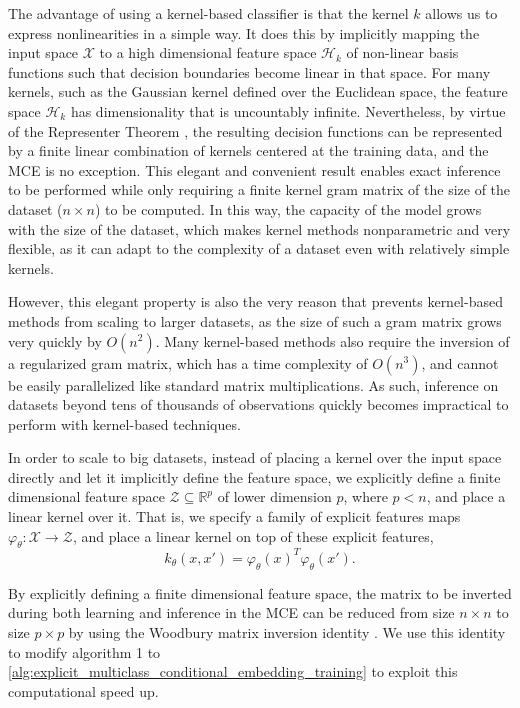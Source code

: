 \documentclass[runningheads, envcountsame, a4paper]{llncs}
\begin{document}
			The advantage of using a kernel-based classifier is that the kernel $k$ allows us to express nonlinearities in a simple way. It does this by implicitly mapping the input space $\mathcal{X}$ to a high dimensional feature space $\mathcal{H}_{k}$ of non-linear basis functions such that decision boundaries become linear in that space. For many kernels, such as the Gaussian kernel defined over the Euclidean space, the feature space $\mathcal{H}_{k}$ has dimensionality that is uncountably infinite. Nevertheless, by virtue of the Representer Theorem \citep{kimeldorf1971some}, the resulting decision functions can be represented by a finite linear combination of kernels centered at the training data, and the \gls{MCE} is no exception. This elegant and convenient result enables exact inference to be performed while only requiring a finite kernel gram matrix of the size of the dataset ($n \times n$) to be computed. In this way, the capacity of the model grows with the size of the dataset, which makes kernel methods nonparametric and very flexible, as it can adapt to the complexity of a dataset even with relatively simple kernels. 
			
			However, this elegant property is also the very reason that prevents kernel-based methods from scaling to larger datasets, as the size of such a gram matrix grows very quickly by $O(n^{2})$. Many kernel-based methods also require the inversion of a regularized gram matrix, which has a time complexity of $O(n^{3})$, and cannot be easily parallelized like standard matrix multiplications. As such, inference on datasets beyond tens of thousands of observations quickly becomes impractical to perform with kernel-based techniques.
			
			In order to scale to big datasets, instead of placing a kernel over the input space directly and let it implicitly define the feature space, we explicitly define a finite dimensional feature space $\mathcal{Z} \subseteq \mathbb{R}^{p}$ of lower dimension $p$, where $p < n$, and place a linear kernel over it. That is, we specify a family of explicit features maps $\varphi_{\theta} : \mathcal{X} \to \mathcal{Z}$, and place a linear kernel on top of these explicit features,
			\begin{equation}
			k_{\theta}(x, x') = \varphi_{\theta}(x)^{T} \varphi_{\theta}(x').
			\end{equation}
			
			By explicitly defining a finite dimensional feature space, the matrix to be inverted during both learning and inference in the \gls{MCE} can be reduced from size $n \times n$ to size $p \times p$ by using the Woodbury matrix inversion identity \citep{higham2002accuracy}. We use this identity to modify algorithm 1 to \cref{alg:explicit_multiclass_conditional_embedding_training} to exploit this computational speed up.
			
\end{document}
